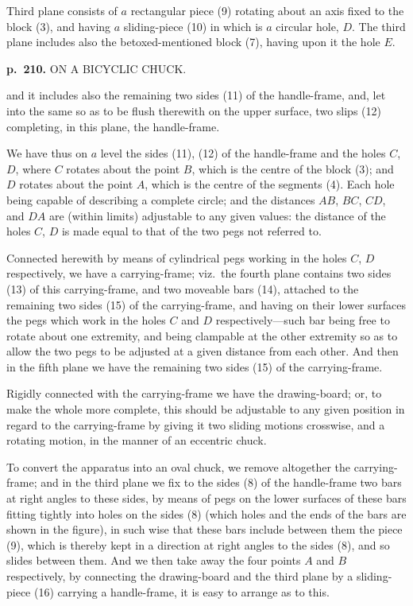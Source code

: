 \documentclass[11pt,a4paper]{article}
\begin{document}
Third plane consists of $a$ rectangular piece (9) rotating about an axis fixed to the block (3), and having $a$ sliding-piece (10) in which is $a$ circular hole, $D$.  The third plane includes also the betoxed-mentioned block (7), having upon it the hole $E$.

\clearpage

\noindent
\textbf{p.~210.}  ON A BICYCLIC CHUCK.

and it includes also the remaining two sides (11) of the handle-frame, and, let into the same so as to be flush therewith on the upper surface, two slips (12) completing, in this plane, the handle-frame.

We have thus on $a$ level the sides (11), (12) of the handle-frame and the holes
$C$, $D$, where $C$ rotates about the point $B$, which is the centre of the block (3); and
$D$ rotates about the point $A$, which is the centre of the segments (4).  Each hole being
capable of describing a complete circle; and the distances $AB$, $BC$, $CD$, and $DA$ are
(within limits) adjustable to any given values: the distance of the holes $C$, $D$ is made
equal to that of the two pegs not referred to.

Connected herewith by means of cylindrical pegs working in the holes $C$, $D$
respectively, we have a carrying-frame; viz.\ the fourth plane contains two sides (13)
of this carrying-frame, and two moveable bars (14), attached to the remaining two
sides (15) of the carrying-frame, and having on their lower surfaces the pegs which
work in the holes $C$ and $D$ respectively---such bar being free to rotate about one
extremity, and being clampable at the other extremity so as to allow the two pegs
to be adjusted at a given distance from each other.  And then in the fifth plane we
have the remaining two sides (15) of the carrying-frame.

Rigidly connected with the carrying-frame we have the drawing-board; or, to make
the whole more complete, this should be adjustable to any given position in regard
to the carrying-frame by giving it two sliding motions crosswise, and a rotating motion,
in the manner of an eccentric chuck.

To convert the apparatus into an oval chuck, we remove altogether the carrying-frame; and in the third plane we fix to the sides (8) of the handle-frame two bars
at right angles to these sides, by means of pegs on the lower surfaces of these bars
fitting tightly into holes on the sides (8) (which holes and the ends of the bars are
shown in the figure), in such wise that these bars include between them the piece
(9), which is thereby kept in a direction at right angles to the sides (8), and so
slides between them.  And we then take away the four points $A$ and $B$ respectively,
by connecting the drawing-board and the third plane by a sliding-piece (16) carrying
a handle-frame, it is easy to arrange as to this.
\end{document}
